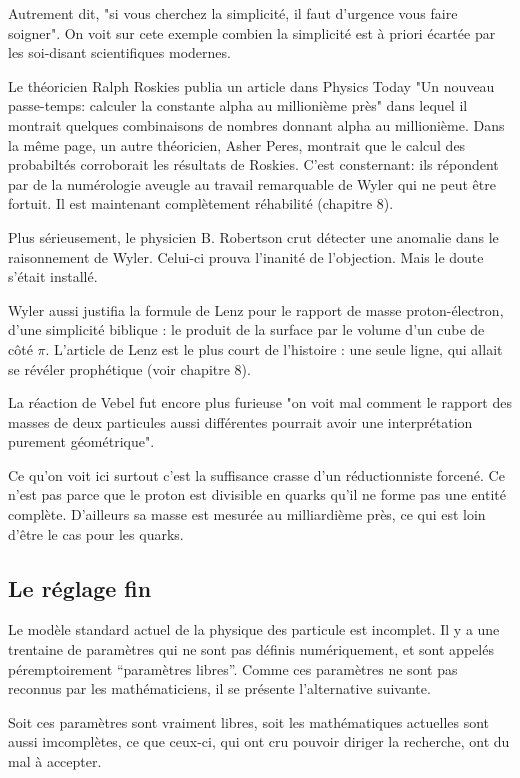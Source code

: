 \documentclass[a4paper,12pt]{article}
\begin{document}
Autrement dit, "si vous cherchez la simplicité, il faut d'urgence vous faire soigner". On voit sur cete exemple combien la simplicité est à priori écartée par les soi-disant scientifiques modernes.

Le théoricien Ralph Roskies publia un article dans Physics Today "Un nouveau passe-temps: calculer la constante alpha au millionième près" dans lequel il montrait quelques combinaisons de nombres donnant alpha au millionième. Dans la même page, un autre théoricien, Asher Peres, montrait que le calcul des probabiltés corroborait les résultats de Roskies. C'est consternant: ils répondent par de la numérologie aveugle au travail remarquable de Wyler qui ne peut être fortuit. Il est maintenant complètement réhabilité (chapitre 8).

Plus sérieusement, le physicien B. Robertson crut détecter une anomalie dans le raisonnement de Wyler. Celui-ci prouva l'inanité de l'objection. Mais le doute s'était installé. 

Wyler aussi justifia la formule de Lenz pour le rapport de masse proton-électron, d'une simplicité biblique : le produit de la surface par le volume d'un cube de côté $\pi$. L'article de Lenz est le plus court de l'histoire : une seule ligne, qui allait se révéler prophétique (voir chapitre 8).


La réaction de Vebel fut encore plus furieuse "on voit mal comment le rapport des masses de deux particules aussi différentes pourrait avoir une interprétation purement géométrique".  

Ce qu'on voit ici surtout c'est la suffisance crasse d'un réductionniste forcené. Ce n'est pas parce que le proton est divisible en quarks qu'il ne forme pas une entité complète. D'ailleurs sa masse est mesurée au milliardième près, ce qui est loin d'être le cas pour les quarks.



\subsection{Le réglage fin}

Le modèle standard actuel de la physique des particule est incomplet. Il y a une trentaine de paramètres qui ne sont pas définis numériquement, et sont appelés péremptoirement ``paramètres libres''. Comme ces paramètres ne sont pas reconnus par les mathématiciens, il se présente l'alternative suivante. 


Soit ces paramètres sont vraiment libres, soit les mathématiques actuelles sont aussi imcomplètes, ce que ceux-ci, qui ont cru pouvoir diriger la recherche, ont du mal à accepter.
\end{document}
